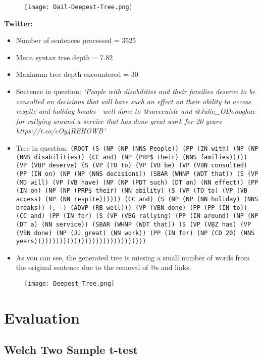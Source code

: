 \documentclass[a4paper,11pt]{article}
\begin{document}
\begin{figure}[H]
    \centering
    \texttt{[image: Dail-Deepest-Tree.png]}
\end{figure}
\textbf{Twitter:}
\begin{itemize}
    \item Number of sentences processed = 3525
    \item Mean syntax tree depth = 7.82
    \item Maximum tree depth encountered = 30
    \item Sentence in question: \textit{`People with disabilities and their families deserve to be consulted on decisions that will have such an effect on their ability to access respite and holiday breaks - well done to @savecuisle and @Julie\_ODonoghue for rallying around a service that has done great work for 20 years https://t.co/cOy4REHOWB'}
    \item Tree in question:
    \texttt{(ROOT (S (NP (NP (NNS People)) (PP (IN with) (NP (NP (NNS disabilities)) (CC and) (NP (PRP\$ their) (NNS families))))) (VP (VBP deserve) (S (VP (TO to) (VP (VB be) (VP (VBN consulted) (PP (IN on) (NP (NP (NNS decisions)) (SBAR (WHNP (WDT that)) (S (VP (MD will) (VP (VB have) (NP (NP (PDT such) (DT an) (NN effect)) (PP (IN on) (NP (NP (PRP\$ their) (NN ability) (S (VP (TO to) (VP (VB access) (NP (NN respite)))))) (CC and) (S (NP (NP (NN holiday) (NNS breaks)) (, -) (ADVP (RB well))) (VP (VBN done) (PP (PP (IN to)) (CC and) (PP (IN for) (S (VP (VBG rallying) (PP (IN around) (NP (NP (DT a) (NN service)) (SBAR (WHNP (WDT that)) (S (VP (VBZ has) (VP (VBN done) (NP (JJ great) (NN work)) (PP (IN for) (NP (CD 20) (NNS years)))))))))))))))))))))))))))))))}
    \item As you can see, the generated tree is missing a small number of words from the original sentence due to the removal of @s and links.
\end{itemize}

\begin{figure}[H]
    \centering
    \texttt{[image: Deepest-Tree.png]}
\end{figure}

\section{Evaluation}
\subsection{Welch Two Sample t-test}
\end{document}
